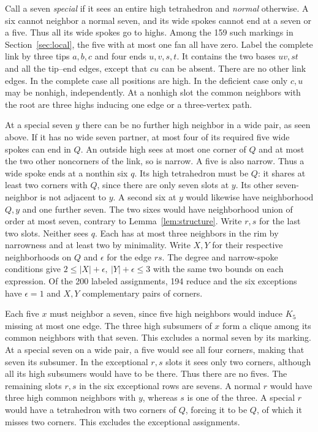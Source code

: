 \documentclass[11pt,a4paper]{amsart}
\begin{document}
Call a seven \emph{special} if it sees an entire high tetrahedron
and \emph{normal} otherwise. A six cannot neighbor a normal
seven, and its wide spokes cannot end at a seven or a five.
Thus all its wide spokes go to highs. Among the 159 such markings
in Section~\ref{sec:local}, the five with at most one fan all have
zero. Label the complete link by three tips $a,b,c$ and four
ends $u,v,s,t$. It contains the two bases $uv,st$ and all the
tip--end edges, except that $cu$ can be absent. There are no
other link edges. In the complete case all positions are high.
In the deficient case only $c,u$ may be nonhigh, independently.
At a nonhigh slot the common neighbors with the root are three
highs inducing one edge or a three-vertex path.

At a special seven $y$ there can be no further high neighbor
in a wide pair, as seen above. If it has no wide seven partner,
at most four of its required five wide spokes can end in $Q$.
An outside high sees at most one corner of $Q$ and at most the two
other noncorners of the link, so is narrow. A five is also narrow.
Thus a wide spoke ends at a nonthin six $q$. Its high tetrahedron
must be $Q$: it shares at least two corners with $Q$, since
there are only seven slots at $y$. Its other seven-neighbor is
not adjacent to $y$. A second six at $y$ would likewise have
neighborhood $Q,y$ and one further seven. The two sixes would
have neighborhood union of order at most seven, contrary to
Lemma~\ref{lem:structure}. Write $r,s$ for the last two slots.
Neither sees $q$. Each has at most three neighbors in the rim
by narrowness and at least two by minimality. Write $X,Y$ for
their respective neighborhoods on $Q$ and $\epsilon$ for the
edge $rs$. The degree and narrow-spoke conditions give
$2\le |X|+\epsilon,\ |Y|+\epsilon\le3$ with the same two bounds
on each expression. Of the 200 labeled assignments, 194 reduce
and the six exceptions have $\epsilon=1$ and $X,Y$ complementary
pairs of corners.

Each five $x$ must neighbor a seven, since five high neighbors
would induce $K_5$ missing at most one edge. The three high
subsumers of $x$ form a clique among its common neighbors with
that seven. This excludes a normal seven by its marking. At a
special seven on a wide pair, a five would see all four corners,
making that seven its subsumer. In the exceptional $r,s$ slots
it sees only two corners, although all its high subsumers would
have to be there. Thus there are no fives. The remaining slots
$r,s$ in the six exceptional rows are sevens. A normal $r$ would
have three high common neighbors with $y$, whereas $s$ is one
of the three. A special $r$ would have a tetrahedron with two
corners of $Q$, forcing it to be $Q$, of which it misses two
corners. This excludes the exceptional assignments.
\end{document}
